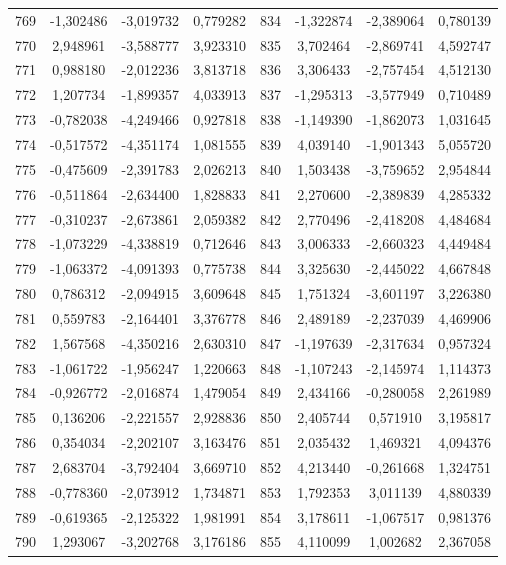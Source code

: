 \begin{apendicesenv}
\begin{table}[H]
\begin{tabular}{c c c c c c c c}
		769 & -1,302486 & -3,019732 & 0,779282 & 834 & -1,322874 & -2,389064 & 0,780139 \\
		770 & 2,948961 & -3,588777 & 3,923310 & 835 & 3,702464 & -2,869741 & 4,592747 \\
		771 & 0,988180 & -2,012236 & 3,813718 & 836 & 3,306433 & -2,757454 & 4,512130 \\
		772 & 1,207734 & -1,899357 & 4,033913 & 837 & -1,295313 & -3,577949 & 0,710489 \\
		773 & -0,782038 & -4,249466 & 0,927818 & 838 & -1,149390 & -1,862073 & 1,031645 \\
		774 & -0,517572 & -4,351174 & 1,081555 & 839 & 4,039140 & -1,901343 & 5,055720 \\
		775 & -0,475609 & -2,391783 & 2,026213 & 840 & 1,503438 & -3,759652 & 2,954844 \\
		776 & -0,511864 & -2,634400 & 1,828833 & 841 & 2,270600 & -2,389839 & 4,285332 \\
		777 & -0,310237 & -2,673861 & 2,059382 & 842 & 2,770496 & -2,418208 & 4,484684 \\
		778 & -1,073229 & -4,338819 & 0,712646 & 843 & 3,006333 & -2,660323 & 4,449484 \\
		779 & -1,063372 & -4,091393 & 0,775738 & 844 & 3,325630 & -2,445022 & 4,667848 \\
		780 & 0,786312 & -2,094915 & 3,609648 & 845 & 1,751324 & -3,601197 & 3,226380 \\
		781 & 0,559783 & -2,164401 & 3,376778 & 846 & 2,489189 & -2,237039 & 4,469906 \\
		782 & 1,567568 & -4,350216 & 2,630310 & 847 & -1,197639 & -2,317634 & 0,957324 \\
		783 & -1,061722 & -1,956247 & 1,220663 & 848 & -1,107243 & -2,145974 & 1,114373 \\
		784 & -0,926772 & -2,016874 & 1,479054 & 849 & 2,434166 & -0,280058 & 2,261989 \\
		785 & 0,136206 & -2,221557 & 2,928836 & 850 & 2,405744 & 0,571910 & 3,195817 \\
		786 & 0,354034 & -2,202107 & 3,163476 & 851 & 2,035432 & 1,469321 & 4,094376 \\
		787 & 2,683704 & -3,792404 & 3,669710 & 852 & 4,213440 & -0,261668 & 1,324751 \\
		788 & -0,778360 & -2,073912 & 1,734871 & 853 & 1,792353 & 3,011139 & 4,880339 \\
		789 & -0,619365 & -2,125322 & 1,981991 & 854 & 3,178611 & -1,067517 & 0,981376 \\
		790 & 1,293067 & -3,202768 & 3,176186 & 855 & 4,110099 & 1,002682 & 2,367058 \\

\end{tabular}
\end{table}
\end{apendicesenv}
